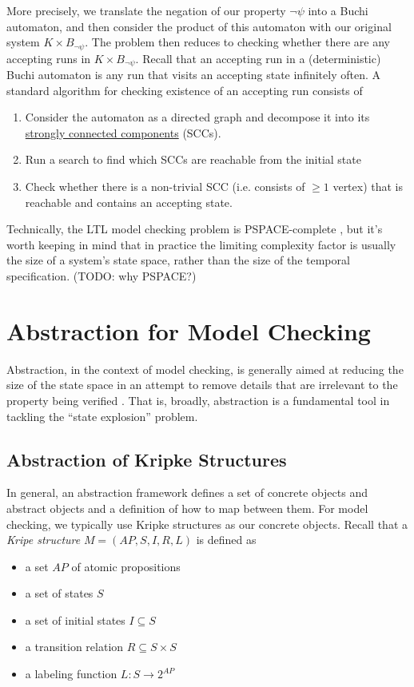 \documentclass[10pt,a4paper]{article}
\begin{document}
More precisely, we translate the negation of our property $\neg \psi$ into a Buchi automaton, and then consider the product of this automaton with our original system $K \times B_{\neg \psi}$. The problem then reduces to checking whether there are any accepting runs in $K \times B_{\neg \psi}$. Recall that an accepting run in a (deterministic) Buchi automaton is any run that visits an accepting state infinitely often. A standard algorithm for checking existence of an accepting run consists of
\begin{enumerate}
    \item Consider the automaton as a directed graph and decompose it into its \href{https://will62794.github.io/my-notes/notes/Strongly_Connected_Components/Strongly_Connected_Components.html}{strongly connected components} (SCCs).
    \item Run a search to find which SCCs are reachable from the initial state
    \item Check whether there is a non-trivial SCC (i.e. consists of $\geq 1$ vertex) that is reachable and contains an accepting state.
\end{enumerate}

Technically, the LTL model checking problem is PSPACE-complete \cite{1985sistlaclarke}, but it's worth keeping in mind that in practice the limiting complexity factor is usually the size of a system's state space, rather than the size of the temporal specification. (TODO: why PSPACE?)

\section{Abstraction for Model Checking}

Abstraction, in the context of model checking, is generally aimed at reducing the size of the state space in an attempt to remove details that are irrelevant to the property being verified \cite{Dams2018}. That is, broadly, abstraction is a fundamental tool in tackling the ``state explosion'' problem.


\subsection*{Abstraction of Kripke Structures}

In general, an abstraction framework defines a set of concrete objects and abstract objects and a definition of how to map between them. For model checking, we typically use Kripke structures as our concrete objects. Recall that a \textit{Kripe structure} $M=(AP,S,I,R,L)$ is defined as
\begin{itemize}
    \item a set $AP$ of atomic propositions
    \item a set of states $S$
    \item a set of initial states $I \subseteq S$
    \item a transition relation $R \subseteq S \times S$
    \item a labeling function $L : S \rightarrow 2^{AP}$
\end{itemize}
\end{document}

